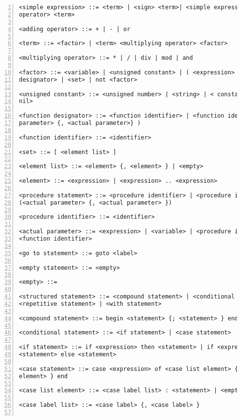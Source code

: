 \begin{Verbatim}[numbers=left]
<simple expression> ::= <term> | <sign> <term>| <simple expression> <adding
operator> <term>

<adding operator> ::= + | - | or

<term> ::= <factor> | <term> <multiplying operator> <factor>

<multiplying operator> ::= * | / | div | mod | and

<factor> ::= <variable> | <unsigned constant> | ( <expression> ) | <function
designator> | <set> | not <factor>

<unsigned constant> ::= <unsigned number> | <string> | < constant identifier> <
nil>

<function designator> ::= <function identifier> | <function identifier ( <actual
parameter> {, <actual parameter>} )

<function identifier> ::= <identifier>

<set> ::= [ <element list> ]

<element list> ::= <element> {, <element> } | <empty>

<element> ::= <expression> | <expression> .. <expression>

<procedure statement> ::= <procedure identifier> | <procedure identifier>
(<actual parameter> {, <actual parameter> })

<procedure identifier> ::= <identifier>

<actual parameter> ::= <expression> | <variable> | <procedure identifier> |
<function identifier>

<go to statement> ::= goto <label>

<empty statement> ::= <empty>

<empty> ::=

<structured statement> ::= <compound statement> | <conditional statement> |
<repetitive statement> | <with statement>

<compound statement> ::= begin <statement> {; <statement> } end;

<conditional statement> ::= <if statement> | <case statement>

<if statement> ::= if <expression> then <statement> | if <expression> then
<statement> else <statement>

<case statement> ::= case <expression> of <case list element> {; <case list
element> } end

<case list element> ::= <case label list> : <statement> | <empty>

<case label list> ::= <case label> {, <case label> }


\end{Verbatim}
